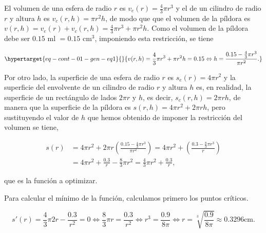 \documentclass[
  a4paper,
]{scrreport}
\theoremstyle{definition}
\theoremstyle{remark}
\begin{document}
\begin{tcolorbox}[enhanced jigsaw, opacityback=0, title=\textcolor{quarto-callout-tip-color}{\faLightbulb}\hspace{0.5em}{Solución}, toptitle=1mm, colframe=quarto-callout-tip-color-frame, leftrule=.75mm, breakable, colback=white, left=2mm, bottomtitle=1mm, rightrule=.15mm, opacitybacktitle=0.6, arc=.35mm, coltitle=black, titlerule=0mm, colbacktitle=quarto-callout-tip-color!10!white, bottomrule=.15mm, toprule=.15mm]

El volumen de una esfera de radio \(r\) es \(v_e(r)=\frac{4}{3}\pi r^3\)
y el de un cilindro de radio \(r\) y altura \(h\) es
\(v_c(r,h)=\pi r^2 h\), de modo que que el volumen de la píldora es
\(v(r,h)=v_e(r)+v_c(r,h) = \frac{4}{3}\pi r^3 + \pi r^2 h\). Como el
volumen de la píldora debe ser \(0.15\) ml \(=0.15\) cm\(^3\),
imponiendo esta restricción, se tiene

\begin{equation}\protect\hypertarget{eq-cont-01-gen-eq1}{}{
v(r,h)=\frac{4}{3}\pi r^3 + \pi r^2 h = 0.15 \Leftrightarrow h = \frac{0.15-\frac{4}{3}\pi r^3}{\pi r^2}.
}\label{eq-cont-01-gen-eq1}\end{equation}

Por otro lado, la superficie de una esfera de radio \(r\) es
\(s_e(r)=4\pi r^2\) y la superficie del envolvente de un cilindro de
radio \(r\) y altura \(h\) es, en realidad, la superficie de un
rectángulo de lados \(2\pi r\) y \(h\), es decir,
\(s_c(r,h) = 2\pi r h\), de manera que la superficie de la píldora es
\(s(r,h) = 4\pi r^2+2\pi r h\), pero sustituyendo el valor de \(h\) que
hemos obtenido de imponer la restricción del volumen se tiene,

\begin{align*}
s(r) &= 4\pi r^2 + 2\pi r \left(\frac{0.15-\frac{4}{3}\pi r^3}{\pi r^2}\right) = 4\pi r^2 + \left(\frac{0.3-\frac{8}{3}\pi r^3}{r}\right)\\ 
&= 4\pi r^2 + \frac{0.3}{r} - \frac{8}{3}\pi r^2 = \frac{4}{3}\pi r^2+ \frac{0.3}{r},
\end{align*}

que es la función a optimizar.

Para calcular el mínimo de la función, calculamos primero los puntos
críticos.

\[
s'(r) = \frac{4}{3}\pi 2r -\frac{0.3}{r^2} =0 \Leftrightarrow \frac{8}{3}\pi r = \frac{0.3}{r^2} \Leftrightarrow r^3 = \frac{0.9}{8\pi} \Leftrightarrow r = \sqrt[3]{\frac{0.9}{8\pi}} \approx 0.3296 \mbox{cm}.
\]


\end{tcolorbox}
\end{document}
